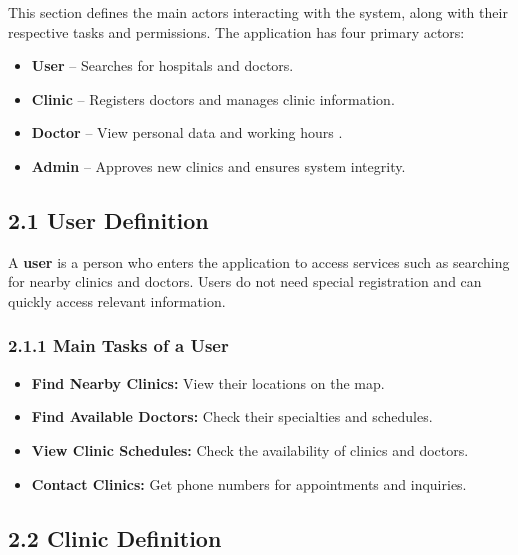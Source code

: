 \documentclass[12pt]{report}
\begin{document}
\noindent This section defines the main actors interacting with the system, along with their respective tasks and permissions. The application has four primary actors:
\begin{itemize}
	\item \textbf{User} – Searches for hospitals and doctors.
	\item \textbf{Clinic} – Registers doctors and manages clinic information.
	\item \textbf{Doctor} – View personal data and working hours .
	\item \textbf{Admin} – Approves new clinics and ensures system integrity.
\end{itemize}

\subsection*{\textbf{2.1 User Definition}}
\noindent A \textbf{user} is a person who enters the application to access services such as searching for nearby clinics and doctors. Users do not need special registration and can quickly access relevant information.

\subsubsection*{\textbf{2.1.1 Main Tasks of a User}}

\begin{itemize}
	\item \textbf{Find Nearby Clinics:} View their locations on the map.
	\item \textbf{Find Available Doctors:} Check their specialties and schedules.
	\item \textbf{View Clinic Schedules:} Check the availability of clinics and doctors.
	\item \textbf{Contact Clinics:} Get phone numbers for appointments and inquiries.
\end{itemize}

\vspace{0.5cm}

\subsection*{\textbf{2.2 Clinic Definition}}
\end{document}
